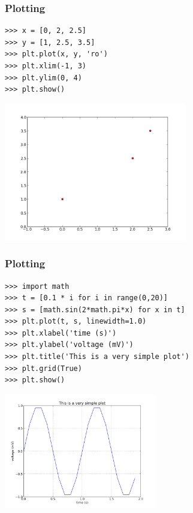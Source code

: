 \begin{frame}[fragile]
	\frametitle{Plotting}
    \begin{myColorBox}{0.9}{}
\begin{verbatim}
>>> x = [0, 2, 2.5]
>>> y = [1, 2.5, 3.5]
>>> plt.plot(x, y, 'ro')
>>> plt.xlim(-1, 3)
>>> plt.ylim(0, 4)
>>> plt.show()
\end{verbatim}
    \end{myColorBox}
\pause
\begin{center}
      \includegraphics[width=0.6\textwidth]{pix/matplotlib_example_2}
\end{center}
\end{frame}

\begin{frame}[fragile]
    \frametitle{Plotting}
    \begin{myColorBox}{0.9}{}
\begin{verbatim}
>>> import math
>>> t = [0.1 * i for i in range(0,20)]
>>> s = [math.sin(2*math.pi*x) for x in t]
>>> plt.plot(t, s, linewidth=1.0)
>>> plt.xlabel('time (s)')
>>> plt.ylabel('voltage (mV)')
>>> plt.title('This is a very simple plot')
>>> plt.grid(True)
>>> plt.show()
\end{verbatim}
    \end{myColorBox}
\pause
\begin{center}
      \includegraphics[width=0.5\textwidth]{pix/matplotlib_example_3}
\end{center}
\end{frame}

